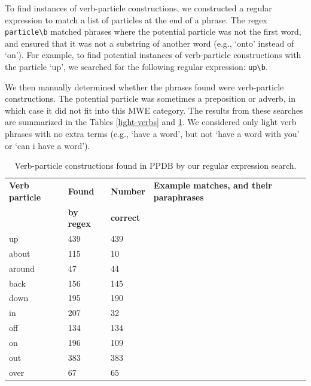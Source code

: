 \documentclass[11pt]{article}
\begin{document}
To find instances of verb-particle constructions, we constructed a regular expression to match a list of particles at the end of a phrase. The regex {\tt particle\textbackslash b} matched phrases where the potential particle was not the first word, and ensured that it was not a substring of another word (e.g., `onto' instead of `on'). For example, to find potential instances of verb-particle constructions with the particle `up', we searched for the following regular expression: {\tt up\textbackslash b}.

We then manually determined  whether the phrases found were verb-particle constructions. The potential particle was sometimes a preposition or adverb, in which case it did not fit into this MWE category. 
The results from these searches are summarized in the Tables \ref{light-verbs} and \ref{verb-particle}. We considered only light verb phrases with no extra terms (e.g., `have a word', but not `have a word with you' or `can i have a word').


\begin{table}
\begin{center}
\begin{tabular}{|l|l|l|p{.5\linewidth}|}
\hline \bf Verb particle & \bf Found  & \bf Number  & \bf Example matches, and their paraphrases\\ 
 & \bf   by regex & \bf correct & \\ \hline
up & 439 & 439 & \\
about & 115 & 10 & \\
around & 47 & 44 \\
back & 156 & 145 \\
down & 195 & 190 \\
in & 207 & 32 \\
off & 134 & 134 \\
on & 196 & 109 \\
out & 383 & 383 \\
over & 67 & 65 \\
\hline
\end{tabular}
\end{center}
\caption{\label{verb-particle} Verb-particle constructions found in PPDB by our regular expression search. }
\end{table}
\end{document}
